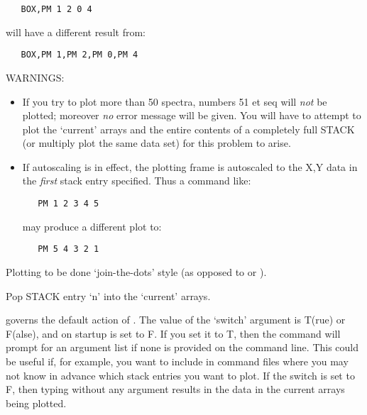 \begin {description}
\begin{verbatim}
   BOX,PM 1 2 0 4
\end{verbatim}

will have a different result from:

\begin{verbatim}
   BOX,PM 1,PM 2,PM 0,PM 4
\end{verbatim}

WARNINGS:

\begin{itemize}

\item If you try to plot more than 50 spectra, numbers 51 et seq will
{\em not} be plotted; moreover {\em no} error message will be given.
You will have to attempt to plot the `current' arrays and the entire
contents of a completely full STACK (or multiply plot the same
data set) for this problem to arise.

\item If autoscaling is in effect, the plotting frame is autoscaled to
the X,Y data in the {\em first} stack entry specified. Thus a command
like:

\begin{verbatim}
   PM 1 2 3 4 5
\end{verbatim}

may produce a different plot to:

\begin{verbatim}
   PM 5 4 3 2 1
\end{verbatim}

\end{itemize}

Plotting to be done `join-the-dots' style (as opposed to   or ). 

Pop STACK entry `n' into the `current' arrays.

  governs the default action of .  The value of the `switch'
argument is T(rue) or F(alse), and on startup is set to F. If you set
it to T, then the   command will prompt for an argument list if none
is provided on the command line. This could be useful if, for example,
you want to include   in command files where you may not know in
advance which stack entries you want to plot. If the switch is set to
F, then typing   without any argument results in the data in the
current arrays being plotted.


\end{description}
